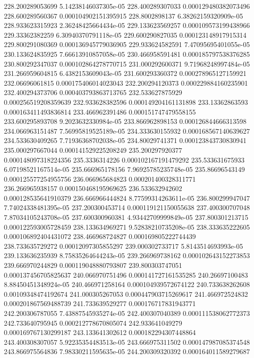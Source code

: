 {228.200289053699 5.14238146037305e-05
228.400289307033 0.000129480382073496
228.600289560367 0.000104902151395915
228.8002898137 6.38262159320909e-05
228.933623315923 2.36248425664434e-05
229.133623569257 0.000109573199438966
229.33362382259 6.30940370791118e-05
229.600290827035 0.000123148917915314
229.800291080369 0.000136945779036905
229.933624582591 7.47095695401055e-05
230.133624835925 7.66613910857058e-05
230.466958591481 0.000185797538376285
230.800292347037 0.000102864278770715
231.000292600371 9.71968248997484e-05
231.266959604815 6.4382153609043e-05
231.600293360372 0.000278965127159921
232.06696061815 0.000175406014023043
232.200294120373 0.000229884160235901
232.400294373706 0.000403793863713765
232.533627875929 0.000256519208359639
232.933628382596 0.000149204161131898
233.13362863593 0.000163411493836814
233.466962391486 0.000151747479558155
233.600295893708 9.2023632330984e-05
233.866962898153 0.000126844666313598
234.066963151487 7.56995819525189e-05
234.333630155932 0.000168567140639627
234.533630409265 7.71936368702038e-05
234.80029741371 0.000123843730830941
235.000297667044 0.000141529225208249
235.200297920377 0.000148097318224356
235.3336314226 0.000102167191479292
235.533631675933 6.07198521167514e-05
235.666965178156 7.96925785235748e-05
235.86696543149 0.000125577254955756
236.066965684823 0.000201400328311771
236.266965938157 0.000150468195969625
236.533632942602 0.000128535641910379
236.666966444824 8.77599314263611e-05
236.800299947047 7.74024338481395e-05
237.200300453714 0.000119121150055638
237.400300707048 7.87034105243708e-05
237.600300960381 4.93442709999849e-05
237.800301213715 0.000122593005728459
238.133634969271 9.52838210735208e-05
238.333635222605 0.000106892404431072
238.466968724827 0.000169805222744439
238.733635729272 0.00012097305855297
239.000302733717 5.8143514693993e-05
239.133636235939 8.75835264644243e-05
239.266969738162 0.000102643152273853
239.666970244829 0.000119048880793807
239.800303747051 0.000137456705825637
240.066970751496 0.000141727161535285
240.26697100483 8.88450451348924e-05
240.466971258164 0.000104939572674122
240.733638262608 0.00109348474192674
241.000305267053 0.000447903715269617
241.466972524832 0.000201867569488739
241.733639529277 0.000176717831943771
242.200306787055 7.43887545935274e-05
242.400307040389 0.000111538062772373
242.733640795945 0.000212778670805074
242.933641049279 0.000169767130299187
243.133641302612 0.000182294307448864
243.400308307057 5.92235354483513e-05
243.666975311502 0.000147987085374548
243.866975564836 7.98330211595635e-05
244.200309320392 0.000164011589279687
}
